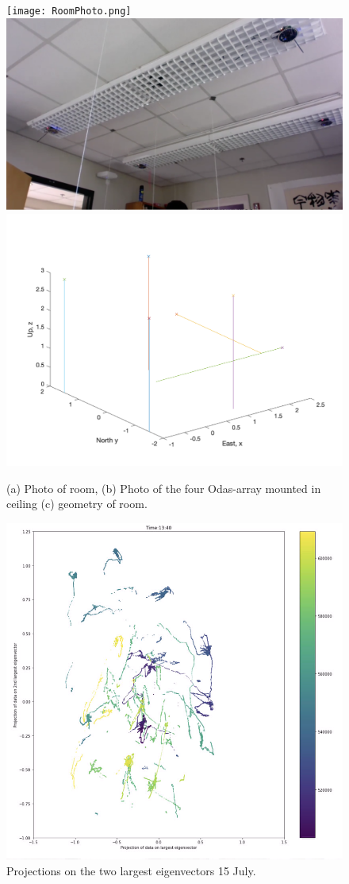 \documentclass[journal]{IEEEtran}
\begin{document}
\begin{figure} %
\centering
	\texttt{[image: RoomPhoto.png]}
	\includegraphics[width=0.6\columnwidth]{RoomCeiling.png}
	\includegraphics[width=1\columnwidth]{Fig/roomgeometry.png}
\caption{(a) Photo of room, (b) Photo of the four Odas-array mounted in ceiling (c) geometry of room. }
\label{fig:room}
\end{figure}
\begin{figure} %
\centering
	\includegraphics[width=0.9\columnwidth]{projection15July.png}
\caption{Projections on the two largest eigenvectors 15 July. }
\label{fig:projections}
\end{figure}
\end{document}

